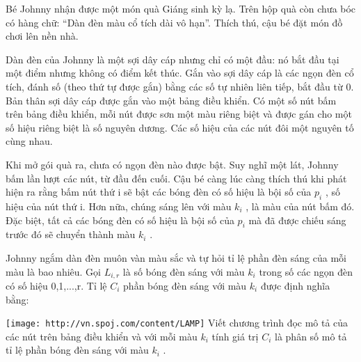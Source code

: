 Bé Johnny nhận được một món quà Giáng sinh kỳ lạ. Trên hộp quà còn chưa bóc có hàng chữ: “Dàn đèn màu cổ tích dài vô hạn”. Thích thú, cậu bé đặt món đồ chơi lên nền nhà.  

   Dàn đèn của Johnny là một sợi dây cáp nhưng chỉ có một đầu: nó bắt đầu tại một điểm nhưng không có điểm kết thúc. Gắn vào sợi dây cáp là các ngọn đèn cổ tích, đánh số (theo thứ tự được gắn) bằng các số tự nhiên liên tiếp, bắt đầu từ 0. Bản thân sợi dây cáp được gắn vào một bảng điều khiển. Có một số nút bấm trên bảng điều khiển, mỗi nút được sơn một màu riêng biệt và được gán cho một số hiệu  riêng biệt là số nguyên dương. Các số hiệu của các nút đôi một nguyên tố cùng nhau.  

   Khi mở gói quà ra, chưa có ngọn đèn nào được bật. Suy nghĩ một lát, Johnny bấm lần lượt các nút, từ đầu đến cuối. Cậu bé càng lúc càng thích thú khi phát hiện ra rằng bấm nút thứ i sẽ bật các bóng đèn có số hiệu là bội số của $p_{i}$   , số hiệu của nút thứ i. Hơn nữa, chúng sáng lên với màu $k_{i}$   , là màu của nút bấm đó. Đặc biệt, tất cả các bóng đèn có số hiệu là bội số của $p_{i}$   mà đã được chiếu sáng trước đó sẽ chuyển thành màu $k_{i}$   .  

   Johnny ngắm dàn đèn muôn vàn màu sắc và tự hỏi tỉ lệ phần đèn sáng của mỗi màu là bao nhiêu. Gọi $L_{i,r}$   là số bóng đèn sáng với màu $k_{i}$   trong số các ngọn đèn có số hiệu 0,1,...,r. Tỉ lệ $C_{i}$   phần bóng đèn sáng với màu $k_{i}$   được định nghĩa bằng:  


\texttt{[image: http://vn.spoj.com/content/LAMP]}
Viết chương trình đọc mô tả của các nút trên bảng điều khiển và với mỗi màu $k_{i}$   tính giá trị $C_{i}$   là phân số mô tả tỉ lệ phần bóng đèn sáng với màu $k_{i}$   .